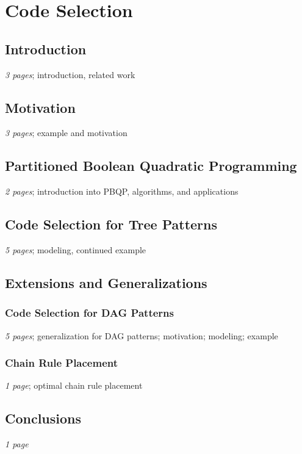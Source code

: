 \chapter{Code Selection }

\section{Introduction}
\emph{3 pages}; introduction, related work

\section{Motivation}
\emph{3 pages}; example and motivation

\section{Partitioned Boolean Quadratic Programming}
\emph{2 pages}; introduction into PBQP, algorithms, and applications

\section{Code Selection for Tree Patterns}
\emph{5 pages}; modeling, continued example

\section{Extensions and Generalizations}

\subsection{Code Selection for DAG Patterns} 
\emph{5 pages}; generalization for DAG patterns; motivation; modeling; example

\subsection{Chain Rule Placement}
\emph{1 page}; optimal chain rule placement

\section{Conclusions}
\emph{1 page}
